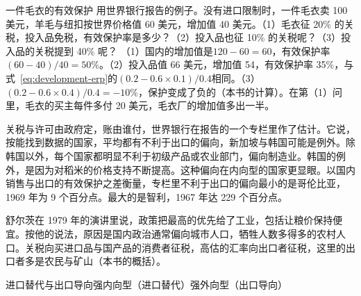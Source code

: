 \begin{example}{一件毛衣的有效保护}\label{ex:development-erp}
用世界银行报告的例子\cite{wdr1987}。没有进口限制时，一件毛衣卖 100 美元，羊毛与纽扣按世界价格值 60 美元，增加值 40 美元。（1）毛衣征 20\% 的关税，投入品免税，有效保护率是多少？（2）投入品也征 10\% 的关税呢？（3）投入品的关税提到 40\% 呢？
\solution
（1）国内的增加值是$120-60=60$，有效保护率$(60-40)/40=50\%$。（2）投入品值 66 美元，增加值 54，有效保护率 35\%，与式~\eqref{eq:development-erp}的$(0.2-0.6\times0.1)/0.4$相同\cite{wdr1987}。（3）$(0.2-0.6\times0.4)/0.4=-10\%$，保护变成了负的（本书的计算）。在第（1）问里，毛衣的买主每件多付 20 美元，毛衣厂的增加值多出一半。
\end{example}

关税与许可由政府定，账由谁付，世界银行在报告的一个专栏里作了估计\cite{wdr1987}。它说，按能找到数据的国家，平均都有不利于出口的偏向，新加坡与韩国可能是例外\cite{wdr1987}。除韩国以外，每个国家都明显不利于初级产品或农业部门，偏向制造业。韩国的例外，是因为对稻米的价格支持不断提高\cite{wdr1987}。这种偏向在内向型的国家更显眼\cite{wdr1987}。以国内销售与出口的有效保护之差衡量，专栏里不利于出口的偏向最小的是哥伦比亚，1969 年为 9 个百分点\cite{wdr1987}。最大的是智利，1967 年达 229 个百分点。

舒尔茨在 1979 年的演讲里说，政策把最高的优先给了工业，包括让粮价保持便宜\cite{schultz1979}。按他的说法，原因是国内政治通常偏向城市人口，牺牲人数多得多的农村人口\cite{schultz1979}。关税向买进口品与国产品的消费者征税，高估的汇率向出口者征税，这里的出口者多是农民与矿山（本书的概括）。

\begin{compare}{进口替代与出口导向}{强内向型（进口替代）}{强外向型（出口导向）}
\end{compare}


